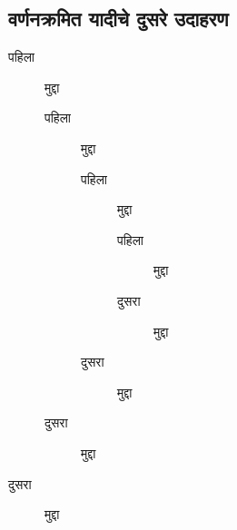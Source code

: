 \subsection*{वर्णनक्रमित यादीचे दुसरे उदाहरण}

\begin{description}
\item[पहिला] मुद्दा
  \begin{description}
  \item[पहिला] मुद्दा
    \begin{description}
    \item[पहिला] मुद्दा
      \begin{description}
      \item[पहिला] मुद्दा
      \item[दुसरा] मुद्दा
      \end{description}
    \item[दुसरा] मुद्दा
    \end{description}
  \item[दुसरा] मुद्दा
  \end{description}
\item[दुसरा] मुद्दा
\end{description}

